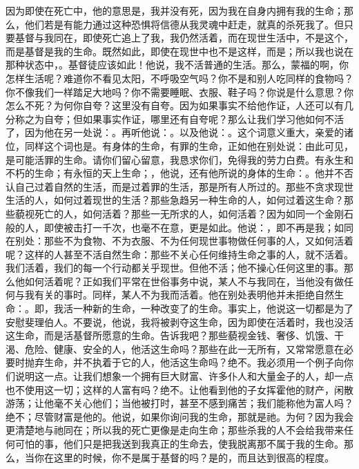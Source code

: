 因为即使在死亡中，他的意思是，我并没有死，因为我在自身内拥有我的生命；那么，他们若是有能力通过这种恐惧将信德从我灵魂中赶走，就真的杀死我了。但只要基督与我同在，即使死亡追上了我，我仍然活着，而在现世生活中，不是这个，而是基督是我的生命。既然如此，即使在现世中也不是这样，而是；所以我也说在那种状态中，。基督徒应该如此！他说，我不活普通的生活。那么，蒙福的啊，你怎样生活呢？难道你不看见太阳，不呼吸空气吗？你不是和别人吃同样的食物吗？你不像我们一样踏足大地吗？你不需要睡眠、衣服、鞋子吗？你说是什么意思？你怎么不死？为何你自夸？这里没有自夸。因为如果事实不给他作证，人还可以有几分称之为自夸；但如果事实作证，哪里还有自夸呢？那么让我们学习他如何不活了，因为他在另一处说：。再听他说：。以及他说：。这个词意义重大，亲爱的诸位，同样这个词也是。有身体的生命，有罪的生命，正如他在别处说：由此可见，是可能活罪的生命。请你们留心留意，我恳求你们，免得我的劳力白费。有永生和不朽的生命；有永恒的天上生命；，他说，还有他所说的身体的生命：。他并不否认自己过着自然的生活，而是过着罪的生活，那是所有人所过的。那些不贪求现世生活的人，如何过着现世的生活？那些急趋另一种生命的人，如何过着这生命？那些藐视死亡的人，如何活着？那些一无所求的人，如何活着？因为如同一个金刚石般的人，即使被击打一千次，也毫不在意，更是如此。他说：，即不再是我；如同在别处：那些不为食物、不为衣服、不为任何现世事物做任何事的人，又如何活着呢？这样的人甚至不活自然生命：那些不关心任何维持生命之事的人，就不活着。我们活着，我们的每一个行动都关乎现世。但他不活；他不操心任何这里的事。那么他如何活着呢？正如我们平常在世俗事务中说，某人不与我同在，当他没有做任何与我有关的事时。同样，某人不为我而活着。他在别处表明他并未拒绝自然生命：。即，我活一种新的生命，一种改变了的生命。事实上，他说这一切都是为了安慰斐理伯人。不要说，他说，我将被剥夺这生命，因为即使在活着时，我也没活这生命，而是活基督所愿意的生命。告诉我吧？那些藐视金钱、奢侈、饥饿、干渴、危险、健康、安全的人，他活这生命吗？那些在此一无所有，又常常愿意在必要时抛弃生命，并不执着于它的人，他活这生命吗？绝不。我必须用一个例子向你们说明这一点。让我们想象一个拥有巨大财富、许多仆人和大量金子的人，却一点也不使用这一切；这样的人富有吗？绝不。让他看到他的子女挥霍他的财产，闲散游荡；让他毫不关心他们；当他被打时，甚至不感到痛苦；我们能称他为富人吗？绝不；尽管财富是他的。他说，如果你询问我的生命，那就是祂。为何？因为我会更清楚地与祂同在；所以我的死亡更像是走向生命；那些杀我的人不会给我带来任何可怕的事，他们只是把我送到我真正的生命去，使我脱离那不属于我的生命。那么，当你在这里的时候，你不是属于基督的吗？是的，而且达到很高的程度。\par

